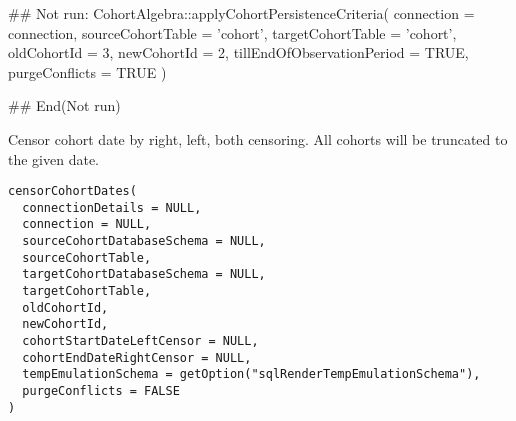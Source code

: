\documentclass[a4paper]{book}
\begin{document}
%
\begin{Examples}
\begin{ExampleCode}
## Not run: 
CohortAlgebra::applyCohortPersistenceCriteria(
  connection = connection,
  sourceCohortTable = 'cohort',
  targetCohortTable = 'cohort',
  oldCohortId = 3,
  newCohortId = 2,
  tillEndOfObservationPeriod = TRUE,
  purgeConflicts = TRUE
)

## End(Not run)

\end{ExampleCode}
\end{Examples}
%
\begin{Description}\relax
Censor cohort date by right, left, both censoring. All cohorts will be truncated to the given date.

\strong{[Experimental]}
\end{Description}
%
\begin{Usage}
\begin{verbatim}
censorCohortDates(
  connectionDetails = NULL,
  connection = NULL,
  sourceCohortDatabaseSchema = NULL,
  sourceCohortTable,
  targetCohortDatabaseSchema = NULL,
  targetCohortTable,
  oldCohortId,
  newCohortId,
  cohortStartDateLeftCensor = NULL,
  cohortEndDateRightCensor = NULL,
  tempEmulationSchema = getOption("sqlRenderTempEmulationSchema"),
  purgeConflicts = FALSE
)
\end{verbatim}
\end{Usage}
%
\end{document}
